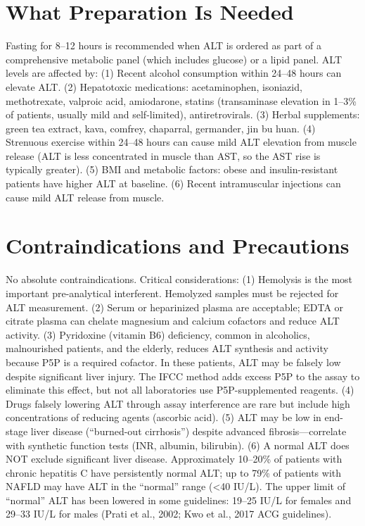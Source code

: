 \section*{What Preparation Is Needed}
Fasting for 8--12 hours is recommended when ALT is ordered as part of a comprehensive metabolic panel (which includes glucose) or a lipid panel. ALT levels are affected by: (1) Recent alcohol consumption within 24--48 hours can elevate ALT. (2) Hepatotoxic medications: acetaminophen, isoniazid, methotrexate, valproic acid, amiodarone, statins (transaminase elevation in 1--3\% of patients, usually mild and self-limited), antiretrovirals. (3) Herbal supplements: green tea extract, kava, comfrey, chaparral, germander, jin bu huan. (4) Strenuous exercise within 24--48 hours can cause mild ALT elevation from muscle release (ALT is less concentrated in muscle than AST, so the AST rise is typically greater). (5) BMI and metabolic factors: obese and insulin-resistant patients have higher ALT at baseline. (6) Recent intramuscular injections can cause mild ALT release from muscle.

\section*{Contraindications and Precautions}
No absolute contraindications. Critical considerations: (1) Hemolysis is the most important pre-analytical interferent. Hemolyzed samples must be rejected for ALT measurement. (2) Serum or heparinized plasma are acceptable; EDTA or citrate plasma can chelate magnesium and calcium cofactors and reduce ALT activity. (3) Pyridoxine (vitamin B6) deficiency, common in alcoholics, malnourished patients, and the elderly, reduces ALT synthesis and activity because P5P is a required cofactor. In these patients, ALT may be falsely low despite significant liver injury. The IFCC method adds excess P5P to the assay to eliminate this effect, but not all laboratories use P5P-supplemented reagents. (4) Drugs falsely lowering ALT through assay interference are rare but include high concentrations of reducing agents (ascorbic acid). (5) ALT may be low in end-stage liver disease (``burned-out cirrhosis'') despite advanced fibrosis---correlate with synthetic function tests (INR, albumin, bilirubin). (6) A normal ALT does NOT exclude significant liver disease. Approximately 10--20\% of patients with chronic hepatitis C have persistently normal ALT; up to 79\% of patients with NAFLD may have ALT in the ``normal'' range (<40 IU/L). The upper limit of ``normal'' ALT has been lowered in some guidelines: 19--25 IU/L for females and 29--33 IU/L for males (Prati et al., 2002; Kwo et al., 2017 ACG guidelines).

